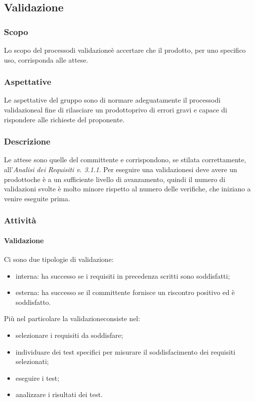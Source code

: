 \subsection{Validazione}

\subsubsection{Scopo}
Lo scopo del processo\glosp di validazione\glosp è accertare che il prodotto\glo, per uno specifico uso, corrisponda alle attese.

\subsubsection{Aspettative}
Le aspettative del gruppo sono di normare adeguatamente il processo\glosp di validazione\glosp al fine di rilasciare un prodotto\glosp privo di errori gravi e capace di rispondere alle richieste del proponente.

\subsubsection{Descrizione}
Le attese sono quelle del committente e corrispondono, se stilata correttamente, all'\textit{Analisi dei Requisiti v. 3.1.1}. 
Per eseguire una validazione\glosp si deve avere un prodotto\glosp che è a un sufficiente livello di avanzamento, quindi il numero di validazioni svolte è molto minore rispetto al numero delle verifiche, che iniziano a venire eseguite prima.

\subsubsection{Attività}
	\paragraph{Validazione}
	Ci sono due tipologie di validazione\glo:
	\begin{itemize}
		\item interna: ha successo se i requisiti in precedenza scritti sono soddisfatti;
		\item esterna: ha successo se il committente fornisce un riscontro positivo ed è soddisfatto.
	\end{itemize}
	Più nel particolare la validazione\glosp consiste nel:	
	\begin{itemize}
		\item selezionare i requisiti da soddisfare;
		\item individuare dei test specifici per misurare il soddisfacimento dei requisiti selezionati;
		\item eseguire i test;
		\item analizzare i risultati dei test.
	\end{itemize}